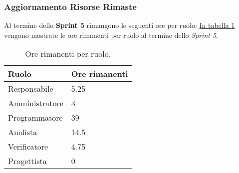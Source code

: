 \subsubsection{Aggiornamento Risorse Rimaste}
\label{sec:AggiornamentoRisorse_Sprint5}
Al termine dello \textbf{Sprint 5} rimangono le seguenti ore per ruolo: \hyperref[tab:sprint5_ore_rimanenti]{In tabella \ref{tab:sprint5_ore_rimanenti}} vengono mostrate le ore rimanenti per ruolo al termine dello \textit{Sprint 5}.

\begin{table}[H]
    \centering
    \begin{tabular}{| l | l |}
    \hline
    \textbf{Ruolo} & 
    \textbf{Ore rimanenti}\\
    \hline
        Responsabile & 5.25\\
    \hline
        Amministratore & 3\\
    \hline
        Programmatore & 39\\
    \hline
        Analista & 14.5\\
    \hline
        Verificatore & 4.75\\
    \hline
        Progettista & 0\\
    \hline
    \end{tabular}
    \caption{Ore rimanenti per ruolo.}
    \label{tab:sprint5_ore_rimanenti} 
\end{table}